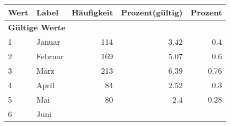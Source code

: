     \begin{longtable}{lXrrr}
     \toprule
     \textbf{Wert} & \textbf{Label} & \textbf{Häufigkeit} & \textbf{Prozent(gültig)} & \textbf{Prozent} \\
     \endhead
     \midrule
     \multicolumn{5}{l}{\textbf{Gültige Werte}}\\

     1 &
     \multicolumn{1}{X}{ Januar   } &


       \num{114} &
       \num[round-mode=places,round-precision=2]{3.42} &
         \num[round-mode=places,round-precision=2]{0.4} \\

     2 &
     \multicolumn{1}{X}{ Februar   } &


       \num{169} &
       \num[round-mode=places,round-precision=2]{5.07} &
         \num[round-mode=places,round-precision=2]{0.6} \\

     3 &
     \multicolumn{1}{X}{ März   } &


       \num{213} &
       \num[round-mode=places,round-precision=2]{6.39} &
         \num[round-mode=places,round-precision=2]{0.76} \\

     4 &
     \multicolumn{1}{X}{ April   } &


       \num{84} &
       \num[round-mode=places,round-precision=2]{2.52} &
         \num[round-mode=places,round-precision=2]{0.3} \\

     5 &
     \multicolumn{1}{X}{ Mai   } &


       \num{80} &
       \num[round-mode=places,round-precision=2]{2.4} &
         \num[round-mode=places,round-precision=2]{0.28} \\

     6 &
     \multicolumn{1}{X}{ Juni   } &



\end{longtable}
